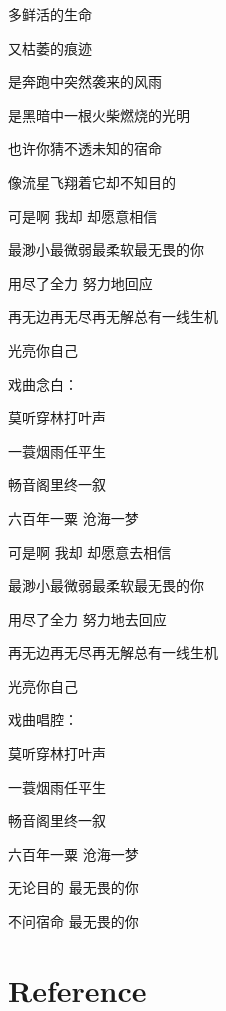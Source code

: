 \documentclass[
]{book}
\begin{document}
多鲜活的生命

又枯萎的痕迹

是奔跑中突然袭来的风雨

是黑暗中一根火柴燃烧的光明

也许你猜不透未知的宿命

像流星飞翔着它却不知目的

可是啊 我却 却愿意相信

最渺小最微弱最柔软最无畏的你

用尽了全力 努力地回应

再无边再无尽再无解总有一线生机

光亮你自己

戏曲念白：

莫听穿林打叶声

一蓑烟雨任平生

畅音阁里终一叙

六百年一粟 沧海一梦

可是啊 我却 却愿意去相信

最渺小最微弱最柔软最无畏的你

用尽了全力 努力地去回应

再无边再无尽再无解总有一线生机

光亮你自己

戏曲唱腔：

莫听穿林打叶声

一蓑烟雨任平生

畅音阁里终一叙

六百年一粟 沧海一梦

无论目的 最无畏的你

不问宿命 最无畏的你

\chapter*{Reference}\label{reference}

  
\end{document}
